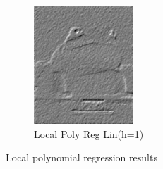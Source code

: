 \documentclass{article}
\begin{document}
\begin{figure}[htb]
\begin{subfigure}[b]{0.24\linewidth}
    \includegraphics[width=\linewidth]{images/poly_nr_lin_true.png}
    \caption{Local Poly Reg Lin(h=1)}
  \end{subfigure}
  \caption{Local polynomial regression results}
  \label{fig:local_poly}
\end{figure}
\end{document}
